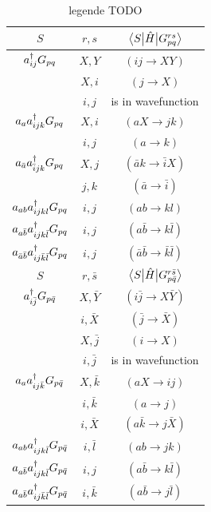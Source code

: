\documentclass[./thesis.tex]{subfiles}
\begin{document}
\begin{table} 
\caption{\alert{legende TODO}}
\label{tab:cipsi_update}
\begin{center}
	\begin{tabular}{ c|c|c }
		\hline \hline \rule{0pt}{3ex}
		$S$									&$ r, s$ 	& $\mel{S}{\hat{H}}{G_{pq}^{rs}}$	\\
		\hline \hline \rule{0pt}{3ex}
		$a^\dagger_{ij} G_{pq}$						& $X,Y$ 	&$(ij \rightarrow XY)$		\\
											& $X,i$ 	&$(j \rightarrow X)$		\\
											& $i,j$ 	&is in wavefunction			\\
		\hline \rule{0pt}{3ex}
		$a_{a} a^\dagger_{ijk} G_{pq}$				&$X,i$		&$(aX \rightarrow jk)$		\\
											&$i,j$		&$(a \rightarrow k)$		\\
		\hline \rule{0pt}{3ex}
		$a_{\bar a} a^\dagger_{\bar i jk} G_{pq}$	&$X,j$		&$(\bar a k \rightarrow \bar i X)$		\\
											&$j,k$		&$(\bar a \rightarrow \bar i)$		\\
		\hline \rule{0pt}{3ex}
		$a_{ab} a^\dagger_{ijkl} G_{pq}$			&$i,j$		&$(ab \rightarrow kl)$		\\
		\hline \rule{0pt}{3ex}
		$a_{a  \bar b} a^\dagger_{ijk \bar l} G_{pq}$			&$i,j$		&$(a \bar b \rightarrow k \bar l)$		\\
		\hline \rule{0pt}{3ex}
		$a_{\bar a \bar b} a^\dagger_{i j \bar k \bar l} G_{pq}$	&$i,j$		&$(\bar a \bar b \rightarrow \bar k \bar l)$		\\
		
		\hline \hline \rule{0pt}{3ex}
		$S$									&$ r, \bar s$ 	& $\mel{S}{\hat{H}}{G_{p \bar q}^{r \bar s}}$	\\
		\hline \hline \rule{0pt}{3ex}
		$a^\dagger_{i \bar j} G_{p \bar q}$				& $X, \bar Y$ 	&$(i \bar j \rightarrow X \bar Y)$		\\
											& $i,\bar X$ 		&$(\bar j \rightarrow \bar X)$		\\
											& $X,\bar j$ 	&$(i \rightarrow X)$		\\
											& $i,\bar j$ 	&is in wavefunction			\\
											
											
		\hline \rule{0pt}{3ex}
		$a_{a} a^\dagger_{ij \bar k} G_{p \bar q}$		&$X,\bar k$		&$(aX \rightarrow ij)$		\\
											&$i,\bar k$		&$(a \rightarrow j)$		\\
											&$i,\bar X$		&$(a \bar k \rightarrow j \bar X)$		\\
											
		\hline \rule{0pt}{3ex}
		$a_{ab} a^\dagger_{ijk \bar l} G_{p \bar q}$			&$i,\bar l$		&$(ab \rightarrow jk)$		\\
		\hline \rule{0pt}{3ex}
		$a_{a  \bar b} a^\dagger_{ijk \bar l} G_{p \bar q}$			&$i,j$		&$(a \bar b \rightarrow k \bar l)$		\\
		\hline \rule{0pt}{3ex}
		$a_{a  \bar b} a^\dagger_{ij \bar k \bar l} G_{p \bar q}$			&$i,\bar k$		&$(a \bar b \rightarrow j \bar l)$		\\
	\end{tabular}
\end{center}
\end{table}
\end{document}
